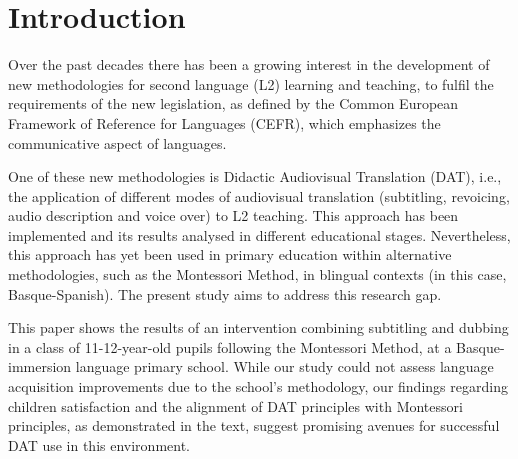 \section{Introduction}\label{sec-introduction}

Over the past decades there has been a growing interest in the
development of new methodologies for second language (L2) learning and
teaching, to fulfil the requirements of the new legislation, as defined
by the Common European Framework of Reference for Languages (CEFR),
which emphasizes the communicative aspect of languages.

One of these new methodologies is Didactic Audiovisual Translation
(DAT), i.e., the application of different modes of audiovisual
translation (subtitling, revoicing, audio description and voice over) to
L2 teaching. This approach has been implemented and its results analysed
in different educational stages. Nevertheless, this approach has yet
been used in primary education within alternative methodologies, such as
the Montessori Method, in blingual contexts (in this case,
Basque-Spanish). The present study aims to address this research gap.

This paper shows the results of an intervention combining subtitling and
dubbing in a class of 11-12-year-old pupils following the Montessori
Method, at a Basque-immersion language primary school. While our study
could not assess language acquisition improvements due to the
school's methodology, our findings regarding children
satisfaction and the alignment of DAT principles with Montessori
principles, as demonstrated in the text, suggest promising avenues for
successful DAT use in this environment.



